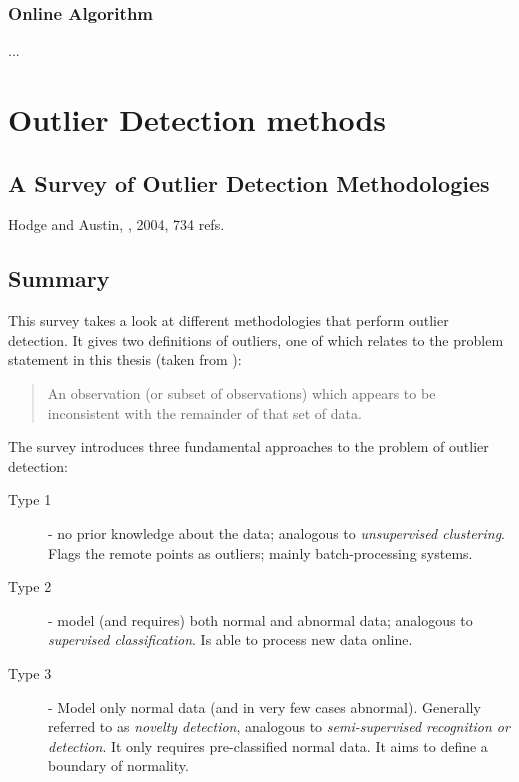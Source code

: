 \subsubsection{Online Algorithm}
...


\section{Outlier Detection methods}
\subsection{A Survey of Outlier Detection Methodologies}
Hodge and Austin, \cite{hodge2004survey}, 2004, 734 refs.

\subsection{Summary}
This survey takes a look at different methodologies that perform outlier detection.
It gives two definitions of outliers, one of which relates to the problem statement in this thesis (taken from \cite{barnett1994outliers}):
\begin{quote}An observation (or subset of observations) which appears to be inconsistent with the remainder of that set of data.\end{quote}

The survey introduces three fundamental approaches to the problem of outlier detection:
\begin{description}
  \item[Type 1] - no prior knowledge about the data; analogous to \emph{unsupervised clustering}. Flags the remote points as outliers; mainly batch-processing systems.
  \item[Type 2] - model (and requires) both normal and abnormal data; analogous to \emph{supervised classification}. Is able to process new data online.
  \item[Type 3] - Model only normal data (and in very few cases abnormal). Generally referred to as \emph{novelty detection}, analogous to \emph{semi-supervised recognition or detection}. It only requires pre-classified normal data. It aims to define a boundary of normality.
\end{description}


